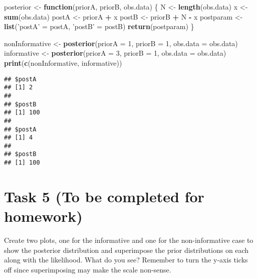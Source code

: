 \documentclass[
]{article}
\newenvironment{Shaded}{\begin{snugshade}}{\end{snugshade}}
\newcommand{\ControlFlowTok}[1]{\textcolor[rgb]{0.13,0.29,0.53}{\textbf{#1}}}
\newcommand{\DataTypeTok}[1]{\textcolor[rgb]{0.13,0.29,0.53}{#1}}
\newcommand{\DecValTok}[1]{\textcolor[rgb]{0.00,0.00,0.81}{#1}}
\newcommand{\KeywordTok}[1]{\textcolor[rgb]{0.13,0.29,0.53}{\textbf{#1}}}
\newcommand{\NormalTok}[1]{#1}
\newcommand{\OperatorTok}[1]{\textcolor[rgb]{0.81,0.36,0.00}{\textbf{#1}}}
\newcommand{\StringTok}[1]{\textcolor[rgb]{0.31,0.60,0.02}{#1}}
\begin{document}
\begin{Shaded}
\begin{Highlighting}[]
\NormalTok{posterior <-}\StringTok{ }\ControlFlowTok{function}\NormalTok{(priorA, priorB, obs.data)}
\NormalTok{\{}
\NormalTok{  N <-}\StringTok{ }\KeywordTok{length}\NormalTok{(obs.data)}
\NormalTok{  x <-}\StringTok{ }\KeywordTok{sum}\NormalTok{(obs.data)}
\NormalTok{  postA <-}\StringTok{ }\NormalTok{priorA }\OperatorTok{+}\StringTok{ }\NormalTok{x}
\NormalTok{    postB <-}\StringTok{ }\NormalTok{priorB }\OperatorTok{+}\StringTok{ }\NormalTok{N }\OperatorTok{-}\StringTok{ }\NormalTok{x}
\NormalTok{    postparam <-}\StringTok{ }\KeywordTok{list}\NormalTok{(}\StringTok{'postA'}\NormalTok{ =}\StringTok{ }\NormalTok{postA, }
     \StringTok{'postB'}\NormalTok{ =}\StringTok{ }\NormalTok{postB)}
    \KeywordTok{return}\NormalTok{(postparam)}
\NormalTok{\}}
\end{Highlighting}
\end{Shaded}

\begin{Shaded}
\begin{Highlighting}[]
\NormalTok{nonInformative <-}\StringTok{ }\KeywordTok{posterior}\NormalTok{(}\DataTypeTok{priorA =} \DecValTok{1}\NormalTok{, }\DataTypeTok{priorB =} \DecValTok{1}\NormalTok{, }\DataTypeTok{obs.data =}\NormalTok{ obs.data)}
\NormalTok{informative <-}\StringTok{ }\KeywordTok{posterior}\NormalTok{(}\DataTypeTok{priorA =} \DecValTok{3}\NormalTok{, }\DataTypeTok{priorB =} \DecValTok{1}\NormalTok{, }\DataTypeTok{obs.data =}\NormalTok{ obs.data)}
\KeywordTok{print}\NormalTok{(}\KeywordTok{c}\NormalTok{(nonInformative, informative))}
\end{Highlighting}
\end{Shaded}

\begin{verbatim}
## $postA
## [1] 2
## 
## $postB
## [1] 100
## 
## $postA
## [1] 4
## 
## $postB
## [1] 100
\end{verbatim}

\hypertarget{task-5-to-be-completed-for-homework}{%
\section{Task 5 (To be completed for
homework)}\label{task-5-to-be-completed-for-homework}}

Create two plots, one for the informative and one for the
non-informative case to show the posterior distribution and superimpose
the prior distributions on each along with the likelihood. What do you
see? Remember to turn the y-axis ticks off since superimposing may make
the scale non-sense.
\end{document}
